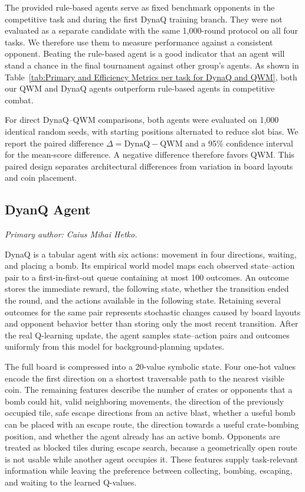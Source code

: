 \documentclass[article, 10pt]{IEEEtran}
\begin{document}
The provided rule-based agents serve as fixed benchmark opponents in the competitive task and during the first DynaQ training branch. They were not evaluated as a separate candidate with the same 1,000-round protocol on all four tasks. We therefore use them to measure performance against a consistent opponent. Beating the rule-based agent is a good indicator that an agent will stand a chance in the final tournament against other group's agents. As shown in Table~\ref{tab:Primary and Efficiency Metrics per task for DynaQ and QWM}, both our QWM and DynaQ agents outperform rule-based agents in competitive combat.

For direct DynaQ--QWM comparisons, both agents were evaluated on 1,000 identical random seeds, with starting positions alternated to reduce slot bias. We report the paired difference $\Delta=\mathrm{DynaQ}-\mathrm{QWM}$ and a 95\% confidence interval for the mean-score difference. A negative difference therefore favors QWM. This paired design separates architectural differences from variation in board layouts and coin placement.

\subsection{DyanQ Agent}\label{subsec:DynaQ Methods}\label{sec:dyna_method}

\textit{Primary author: Caius Mihai Hetko.}

DynaQ is a tabular agent with six actions: movement in four directions, waiting, and placing a bomb. Its empirical world model maps each observed state--action pair to a first-in-first-out queue containing at most 100 outcomes. An outcome stores the immediate reward, the following state, whether the transition ended the round, and the actions available in the following state. Retaining several outcomes for the same pair represents stochastic changes caused by board layouts and opponent behavior better than storing only the most recent transition. After the real Q-learning update, the agent samples state--action pairs and outcomes uniformly from this model for background-planning updates.

The full board is compressed into a 20-value symbolic state. Four one-hot values encode the first direction on a shortest traversable path to the nearest visible coin. The remaining features describe the number of crates or opponents that a bomb could hit, valid neighboring movements, the direction of the previously occupied tile, safe escape directions from an active blast, whether a useful bomb can be placed with an escape route, the direction towards a useful crate-bombing position, and whether the agent already has an active bomb. Opponents are treated as blocked tiles during escape search, because a geometrically open route is not usable while another agent occupies it. These features supply task-relevant information while leaving the preference between collecting, bombing, escaping, and waiting to the learned Q-values.
\end{document}
